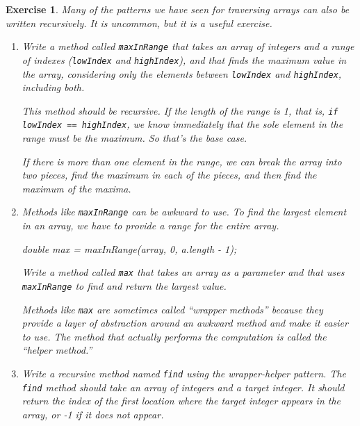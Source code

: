 \documentclass[12pt]{book}
\theoremstyle{exercise}
\newtheorem{exercise}{Exercise}[chapter]
\newcommand{\java}[1]{\verb"#1"}
\newcommand{\java}[1]{\lstinline{#1}} %
\begin{document}
\begin{exercise}
Many of the patterns we have seen for traversing arrays can also be written recursively.
It is uncommon, but it is a useful exercise.

\begin{enumerate}

\item Write a method called \java{maxInRange} that takes an array of integers and a range of indexes (\java{lowIndex} and \java{highIndex}), and that finds the maximum value in the array, considering only the elements between \java{lowIndex} and \java{highIndex}, including both.

This method should be recursive.
If the length of the range is 1, that is, \java{if lowIndex == highIndex}, we know immediately that the sole element in the range must be the maximum.
So that's the base case.

If there is more than one element in the range, we can break the array into two pieces, find the maximum in each of the pieces, and then find the maximum of the maxima.

\item Methods like \java{maxInRange} can be awkward to use.
To find the largest element in an array, we have to provide a range for the entire array.

\begin{code}
    double max = maxInRange(array, 0, a.length - 1);
\end{code}

Write a method called \java{max} that takes an array as a parameter and that uses \java{maxInRange} to find and return the largest value.

Methods like \java{max} are sometimes called ``wrapper methods'' because they provide a layer of abstraction around an awkward method and make it easier to use.
The method that actually performs the computation is called the ``helper method.''

\item Write a recursive method named \java{find} using the wrapper-helper pattern.
The \java{find} method should take an array of integers and a target integer.
It should return the index of the first location where the target integer appears in the array, or -1 if it does not appear.

\end{enumerate}
\end{exercise}
\end{document}
